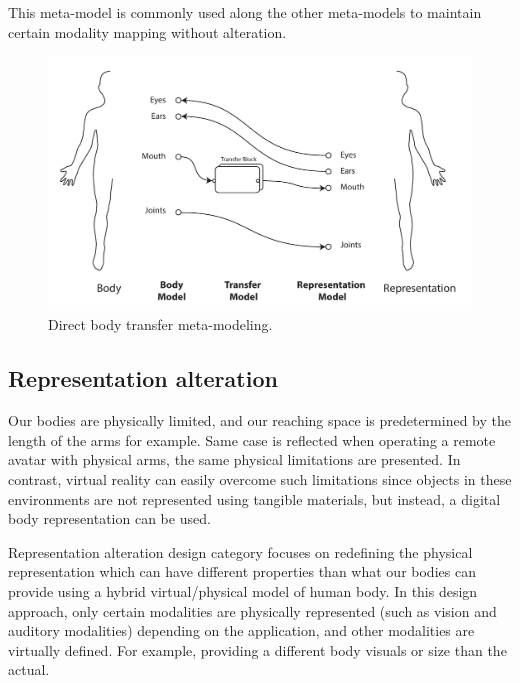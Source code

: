 This meta-model is commonly used along the other meta-models to maintain certain modality mapping without alteration.

\begin{figure}[h!]
  \centering
  \captionsetup{justification=centering}
\includegraphics[width=1\textwidth]{figures/concept/EDD-Direct.pdf}
\caption{Direct body transfer meta-modeling.}
  \label{fig:concept-EDD-Direct}
\end{figure}


\subsection{Representation alteration}
\label{sec:concept-RepAlt}


Our bodies are physically limited, and our reaching space is predetermined by the length of the arms for example. Same case is reflected when operating a remote avatar with physical arms, the same physical limitations are presented. In contrast, virtual reality can easily overcome such limitations since objects in these environments are not represented using tangible materials, but instead, a digital body representation can be used.  

Representation alteration design category focuses on redefining the physical representation which can have different properties than what our bodies can provide using a hybrid virtual/physical model of human body. In this design approach, only certain modalities are physically represented (such as vision and auditory modalities) depending on the application, and other modalities are virtually defined. For example, providing a different body visuals or size than the actual. 


